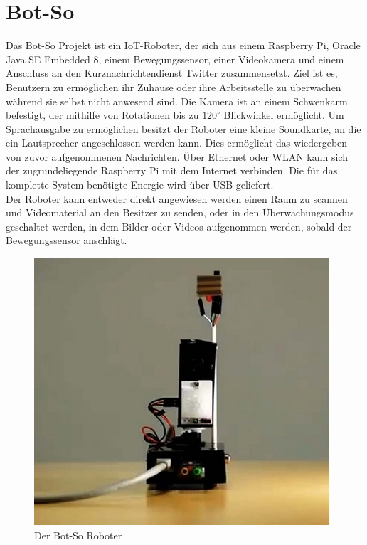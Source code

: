 \section{Bot-So}\label{s:Bot-So}

Das Bot-So Projekt ist ein \ac{IoT}-Roboter, der sich aus einem Raspberry Pi, Oracle Java SE Embedded 8, einem Bewegungssensor, einer Videokamera und einem Anschluss an den Kurznachrichtendienst Twitter zusammensetzt. Ziel ist es, Benutzern zu ermöglichen ihr Zuhause oder ihre Arbeitsstelle zu überwachen während sie selbst nicht anwesend sind. Die Kamera ist an einem Schwenkarm befestigt, der mithilfe von Rotationen bis zu $120^\circ$ Blickwinkel ermöglicht. Um Sprachausgabe zu ermöglichen besitzt der Roboter eine kleine Soundkarte, an die ein Lautsprecher angeschlossen werden kann. Dies ermöglicht das wiedergeben von zuvor aufgenommenen Nachrichten\cite{ws:botsovoice}. Über Ethernet oder WLAN kann sich der zugrundeliegende Raspberry Pi mit dem Internet verbinden. Die für das komplette System benötigte Energie wird über USB geliefert.\\
Der Roboter kann entweder direkt angewiesen werden einen Raum zu scannen und Videomaterial an den Besitzer zu senden, oder in den Überwachungsmodus geschaltet werden, in dem Bilder oder Videos aufgenommen werden, sobald der Bewegungssensor anschlägt\cite{z:botso}.\\

\begin{figure}[H] 
	\centering
	\includegraphics[scale=1.3]{Bilder/botso}
	\caption{Der Bot-So Roboter\cite{i:botso}}
	\label{f:botso}
\end{figure}

